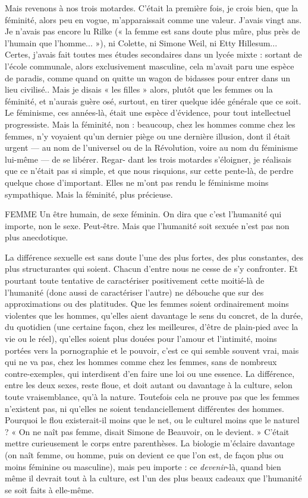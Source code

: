 Mais revenons à nos trois motardes. C’était la première fois, je crois bien,
que la féminité, alors peu en vogue, m’apparaissait comme une valeur. J'avais
vingt ans. Je n'avais pas encore lu Rilke (« la femme est sans doute plus mûre,
plus près de l’humain que l’homme... »), ni Colette, ni Simone Weil, ni Etty
Hillesum... Certes, j'avais fait toutes mes études secondaires dans un lycée
mixte : sortant de l’école communale, alors exclusivement masculine, cela
m'avait paru une espèce de paradis, comme quand on quitte un wagon de
bidasses pour entrer dans un lieu civilisé.. Mais je disais « les filles » alors,
plutôt que les femmes ou la féminité, et n’aurais guère osé, surtout, en tirer
quelque idée générale que ce soit. Le féminisme, ces années-là, était une espèce
d’évidence, pour tout intellectuel progressiste. Mais la féminité, non : beaucoup,
chez les hommes comme chez les femmes, n’y voyaient qu’un dernier
piège ou une dernière illusion, dont il était urgent — au nom de l’universel ou
de la Révolution, voire au nom du féminisme lui-même — de se libérer. Regar-
dant les trois motardes s'éloigner, je réalisais que ce n’était pas si simple, et que
nous risquions, sur cette pente-là, de perdre quelque chose d’important. Elles
ne m'ont pas rendu le féminisme moins sympathique. Mais la féminité, plus
précieuse.

FEMME Un être humain, de sexe féminin. On dira que c’est l’humanité qui
importe, non le sexe. Peut-être. Mais que l’humanité soit sexuée
n’est pas non plus anecdotique.

La différence sexuelle est sans doute l’une des plus fortes, des plus constantes,
des plus structurantes qui soient. Chacun d’entre nous ne cesse de s’y
confronter. Et pourtant toute tentative de caractériser positivement cette
moitié-là de l’humanité (donc aussi de caractériser l’autre) ne débouche que sur
des approximations ou des platitudes. Que les femmes soient ordinairement
moins violentes que les hommes, qu’elles aient davantage le sens du concret, de
la durée, du quotidien (une certaine façon, chez les meilleures, d’être de plain-pied
avec la vie ou le réel), qu’elles soient plus douées pour l’amour et l’intimité,
moins portées vers la pornographie et le pouvoir, c’est ce qui semble souvent
vrai, mais qui ne va pas, chez les hommes comme chez les femmes, sans de
nombreux contre-exemples, qui interdisent d’en faire une loi ou une essence.
La différence, entre les deux sexes, reste floue, et doit autant ou davantage à la
culture, selon toute vraisemblance, qu’à la nature. Toutefois cela ne prouve pas
que les femmes n’existent pas, ni qu’elles ne soient tendanciellement différentes
des hommes. Pourquoi le flou existerait-il moins que le net, ou le culturel
moins que le naturel ? « On ne naît pas femme, disait Simone de Beauvoir, on
le devient. » C’était mettre curieusement le corps entre parenthèses. La biologie
m'éclaire davantage (on naît femme, ou homme, puis on devient ce que l’on
est, de façon plus ou moins féminine ou masculine), mais peu importe : ce
{\it devenir}-là, quand bien même il devrait tout à la culture, est l’un des plus beaux
cadeaux que l'humanité se soit faits à elle-même.

